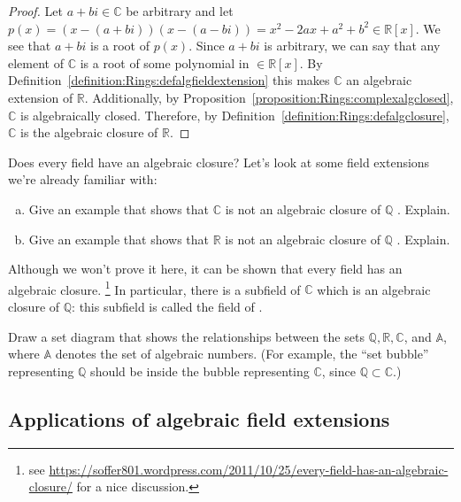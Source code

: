 \begin{proof}{}
Let $a+bi \in \mathbb{C}$ be arbitrary and let $p(x)=(x-(a+bi))(x-(a-bi))= x^2-2ax+a^2+b^2\in\mathbb{R}[x]$. We see that $a+bi$ is a root of $p(x)$. Since $a+bi$ is arbitrary, we can say that any element of $\mathbb{C}$ is a root of some polynomial in $\in\mathbb{R}[x]$. By Definition~\ref{definition:Rings:defalgfieldextension} this makes $\mathbb{C}$ an algebraic extension of $\mathbb{R}$. Additionally, by Proposition~\ref{proposition:Rings:complexalgclosed}, $\mathbb{C}$ is algebraically closed. Therefore, by Definition~\ref{definition:Rings:defalgclosure}, $\mathbb{C}$ is the algebraic closure of $\mathbb{R}$.
\end{proof}

Does every field have an algebraic closure? Let's look at some field extensions we're already familiar with:

\begin{exercise}{}
\begin{enumerate}[(a)]
\item
Give an example that shows that $\mathbb{C}$ is not an algebraic closure of $\mathbb{Q}$ . Explain.
\item
Give an example that shows that $\mathbb{R}$ is not an algebraic closure of $\mathbb{Q}$ . Explain.
\end{enumerate}
\end{exercise}


Although we won't prove it here, it can be shown that every field has an algebraic closure.
\footnote{see  \url{https://soffer801.wordpress.com/2011/10/25/every-field-has-an-algebraic-closure/} for a nice discussion.} In particular, there is a subfield of $\mathbb{C}$ which is an algebraic closure of $\mathbb{Q}$: this subfield is called the field of .

\begin{exercise}{}
Draw a set diagram that shows the relationships between the sets $\mathbb{Q}, \mathbb{R}, \mathbb{C}$, and $\mathbb{A}$, where $\mathbb{A}$ denotes the set of algebraic numbers.  (For example, the ``set bubble'' representing $\mathbb{Q}$ should be inside the bubble representing $\mathbb{C}$, since $\mathbb{Q} \subset \mathbb{C}$.)
\end{exercise}

\subsection{Applications of algebraic field extensions}
\label{subsec:Rings:PolynomialOverFields:AppFieldExtension}

